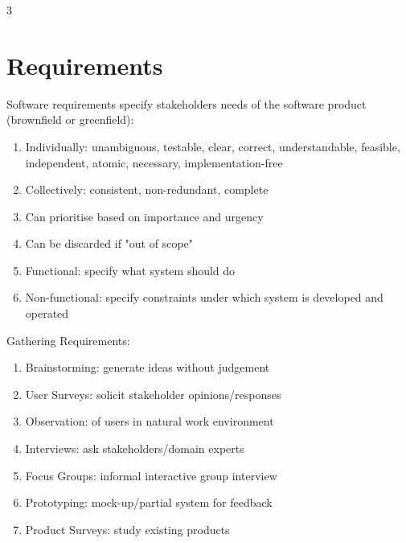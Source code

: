 \documentclass[12pt, a4paper]{article}
\begin{document}
\begin{multicols*}{3}
\section{Requirements}
Software requirements specify stakeholders needs of the software product (brownfield or greenfield):
\begin{enumerate}[\roman*.]
  \item Individually: unambiguous, testable, clear, correct, understandable, feasible, independent, atomic, necessary, implementation-free 
  \item Collectively: consistent, non-redundant, complete
  \item Can prioritise based on importance and urgency
  \item Can be discarded if "out of scope"
  \item Functional: specify what system should do 
  \item Non-functional: specify constraints under which system is developed and operated
\end{enumerate}

Gathering Requirements:
\begin{enumerate}[\roman*.]
  \item Brainstorming: generate ideas without judgement
  \item User Surveys: solicit stakeholder opinions/responses 
  \item Observation: of users in natural work environment
  \item Interviews: ask stakeholders/domain experts
  \item Focus Groups: informal interactive group interview
  \item Prototyping: mock-up/partial system for feedback
  \item Product Surveys: study existing products
\end{enumerate}


\end{multicols*}
\end{document}
